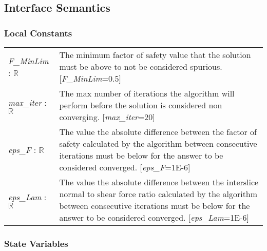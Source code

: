 \documentclass[12pt]{article}
\begin{document}
\subsection{Interface Semantics}

\subsubsection{Local Constants}
\renewcommand*{\arraystretch}{1.5}
\begin{longtable}{ p{}  p{}}
  \textit{F\_MinLim} : $\mathbb{R}$ & The minimum factor of safety
  value that the solution must be above to not be considered
  spurious. [\textit{F\_MinLim}=0.5]\\
  
  \textit{max\_iter} : $\mathbb{R}$ & The max number of iterations the
  algorithm will perform before the solution is considered non
  converging. [\textit{max\_iter}=20]\\

  \textit{eps\_F} : $\mathbb{R}$ & The value the absolute difference
  between the factor of safety calculated by the algorithm between
  consecutive iterations must be below for the answer to be considered
  converged. [\textit{eps\_F}=1E-6]\\

  \textit{eps\_Lam} : $\mathbb{R}$ & The value the absolute difference
  between the interslice normal to shear force ratio calculated by the
  algorithm between consecutive iterations must be below for the
  answer to be considered converged. [\textit{eps\_Lam}=1E-6]\\
\end{longtable}

\subsubsection{State Variables}
\end{document}
